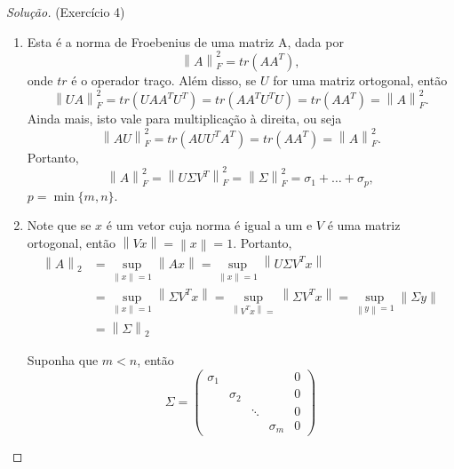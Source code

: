 \documentclass[a4paper,10pt]{article}
\newenvironment{solution}
  {\begin{proof}[Solução]}
  {\end{proof}}
\newcommand{\norm}[1]{\left\lVert#1\right\rVert}
\begin{document}
  \begin{solution}{(Exercício 4)}

    \begin{enumerate}
      \item Esta é a norma de Froebenius de uma matriz A, dada por
        \begin{equation*}
          \norm{A}_F^2 = tr(AA^T),
        \end{equation*}
        onde $tr$ é o operador traço. Além disso, se $U$ for uma matriz ortogonal, então
        \begin{equation*}
          \norm{UA}_F^2 = tr(UAA^TU^T) = tr(AA^TU^TU) = tr(AA^T) = \norm{A}_F^2.
        \end{equation*}
        Ainda mais, isto vale para multiplicação à direita, ou seja
        \begin{equation*}
          \norm{AU}_F^2 = tr(AUU^TA^T) = tr(AA^T) = \norm{A}_F^2.
        \end{equation*}
        Portanto,
        \begin{equation*}
          \norm{A}_F^2 = \norm{U\Sigma V^T}_F^2 = \norm{\Sigma}_F^2 = \sigma_1 + \dots + \sigma_p,
        \end{equation*}
        $p = \min\{m,n\}$.

      \item Note que se $x$ é um vetor cuja norma é igual a um e $V$ é uma matriz ortogonal, então
      $\norm{Vx} = \norm{x} = 1$. Portanto,
      \begin{equation*}
        \begin{split}
          \norm{A}_2 &= \sup_{\norm{x} = 1}\norm{Ax} = \sup_{\norm{x} = 1} \norm{U\Sigma V^Tx} \\
          &= \sup_{\norm{x} = 1} \norm{\Sigma V^Tx} = \sup_{\norm{V^Tx} = }\norm{\Sigma V^Tx}
          = \sup_{\norm{y} = 1}\norm{\Sigma y} \\
          &= \norm{\Sigma}_2
        \end{split}
      \end{equation*}

      Suponha que $m<n$, então
      \begin{equation*}
        \Sigma = \begin{pmatrix}
          \sigma_1 & & &  &0 \\
          &\sigma_2 & & & 0 \\
          & & \ddots & & 0 \\
          & & &\sigma_m & 0
        \end{pmatrix}
      \end{equation*}


\end{enumerate}
\end{solution}
\end{document}
